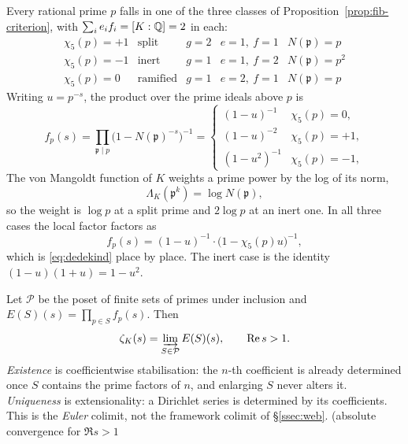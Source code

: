 \begin{proposition}\label{prop:local-factors}
Every rational prime $p$ falls in one of the three classes of
Proposition~\ref{prop:fib-criterion}, with $\sum_i e_if_i=[K:\Q]=2$ in each:
\begin{equation}\label{eq:splitting}
  \begin{array}{lllll}
    \chi_5(p)=+1 & \text{split}    & g=2 & e=1,\ f=1 & N(\mathfrak p)=p\\
    \chi_5(p)=-1 & \text{inert}    & g=1 & e=1,\ f=2 & N(\mathfrak p)=p^{2}\\
    \chi_5(p)=0  & \text{ramified} & g=1 & e=2,\ f=1 & N(\mathfrak p)=p
  \end{array}
\end{equation}
Writing $u=p^{-s}$, the product over the prime ideals above $p$ is
\begin{equation}\label{eq:local-K}
  f_p(s)=\prod_{\mathfrak p\mid p}\bigl(1-N(\mathfrak p)^{-s}\bigr)^{-1}
  =\begin{cases}
     (1-u)^{-1} & \chi_5(p)=0,\\
     (1-u)^{-2} & \chi_5(p)=+1,\\
     (1-u^{2})^{-1} & \chi_5(p)=-1,
   \end{cases}
\end{equation}
The von Mangoldt function of $K$ weights a prime power by the log of its norm,
\begin{equation}\label{eq:LambdaK}
  \Lambda_K(\mathfrak p^{k})=\log N(\mathfrak p),
\end{equation}
so the weight is $\log p$ at a split prime and $2\log p$ at an inert one. In all three cases the
local factor factors as
\begin{equation}\label{eq:local-dedekind}
  f_p(s)=(1-u)^{-1}\cdot\bigl(1-\chi_5(p)u\bigr)^{-1},
\end{equation}
which is \eqref{eq:dedekind} place by place. The inert case is the identity $(1-u)(1+u)=1-u^{2}$.

\end{proposition}

\begin{proposition}\label{prop:euler-colimit}
Let $\mathcal P$ be the poset of finite sets of primes under inclusion and
$E(S)(s)=\prod_{p\in S}f_p(s)$. Then
\begin{equation}\label{eq:colimit}
  \zeta_K(s)=\varinjlim_{S\in\mathcal P}E(S)(s),\qquad \Re s>1 .
\end{equation}
\emph{Existence} is coefficientwise stabilisation: the $n$-th coefficient is already determined
once $S$ contains the prime factors of $n$, and enlarging $S$ never alters it. \emph{Uniqueness} is
extensionality: a Dirichlet series is determined by its coefficients. This is the \emph{Euler}
colimit, not the framework colimit of \S\ref{ssec:web}.  (absolute convergence for
$\Re s>1$~\cite{Riemann1859}
\end{proposition}

